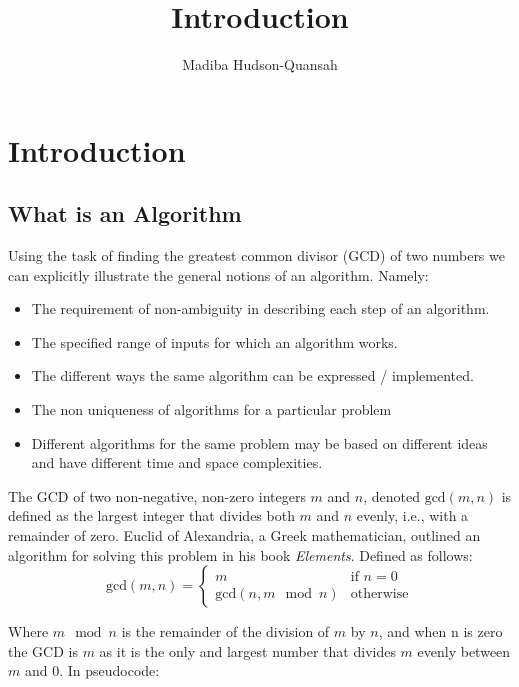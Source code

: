 \documentclass[12pt letter]{report}
\title{\Huge{Introduction}}
\author{\huge{Madiba Hudson-Quansah}}
\date{}
\begin{document}
\maketitle
\newpage
{}
\tableofcontents
\pagebreak

\chapter{Introduction}

\section{What is an Algorithm}


Using the task of finding the greatest common divisor (GCD) of two numbers we can explicitly illustrate the general
notions of an algorithm. Namely:
\begin{itemize}
  \item The requirement of non-ambiguity in describing each step of an algorithm.
  \item  The specified range of inputs for which an algorithm works.
  \item  The different ways the same algorithm can be expressed / implemented.
  \item The non uniqueness of algorithms for a particular problem
  \item Different algorithms for the same problem may be based on different ideas and have different time and space complexities.
\end{itemize}


The GCD of two non-negative, non-zero integers $m$ and $n$, denoted $\text{gcd} \left( m, n \right) $ is defined as the
largest integer that divides both $m$ and $n$ evenly, i.e., with a remainder of zero. Euclid of Alexandria, a Greek
mathematician, outlined an algorithm for solving this problem in his book \textit{Elements}. Defined as follows:
\[
  \text{gcd} \left( m, n \right)  = \begin{cases}
    m                                      & \text{if } n = 0 \\
    \text{gcd} \left( n,  m \mod n \right) & \text{otherwise}
  \end{cases}
\]

Where $m \mod n$ is the remainder of the division of $m$ by $n$, and when n is zero the GCD is $m$ as it is the only and
largest number that divides $m$ evenly between  $m$ and $0$. In pseudocode:
\end{document}
